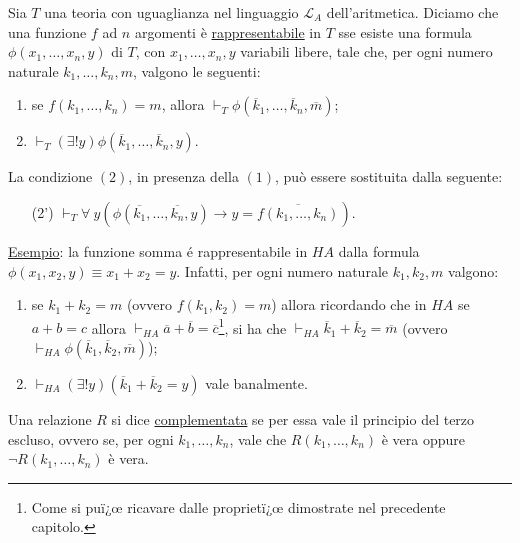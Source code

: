 \begin{defi}
Sia $T$ una teoria con uguaglianza nel linguaggio $\mathcal{L}_{A}$ dell'aritmetica. Diciamo che una funzione $f$ ad $n$ argomenti \`e \underline{rappresentabile} in $T$ sse esiste una formula $\phi(x_{1}, \ldots,x_{n}, y)$ di $T$, con $x_{1}, \ldots, x_{n}, y$ variabili libere, tale che, per ogni numero naturale $k_{1}, \ldots, k_{n}, m$, valgono le seguenti:
\begin{enumerate}
  \item se $f(k_{1}, \ldots,k_{n})=m$, allora $\vdash_{T} \phi(\overline{k}_{1}, \ldots, \overline{k}_{n}, \overline{m})$;
  \item $\vdash_{T} (\exists ! y) \phi(\overline{k}_{1}, \ldots, \overline{k}_{n}, y)$.
\end{enumerate}
La condizione $(2)$, in presenza della $(1)$, pu\`o essere sostituita dalla seguente:
\begin{enumerate}
\item[(2')] $\vdash_{T} \forall\ y (\phi(\overline{k_1},\ldots,\overline{k_n}, y)\rightarrow y = \overline{f(k_1,\ldots,k_n)})$.
\end{enumerate}
\end{defi}
\vspace{0.1cm}
\underline{Esempio}: la funzione somma \'e rappresentabile in $HA$ dalla formula $\phi(x_{1},x_{2},y)\equiv x_{1}+x_{2}=y$. Infatti, per ogni numero naturale $k_{1}, k_{2}, m$ valgono:\\
 \begin{enumerate}
  \item se $k_{1}+k_{2}=m$ (ovvero $f(k_{1}, k_{2})=m$) allora ricordando che in $HA$ se $a+b=c$ allora $\vdash_{HA} \overline{a}+\overline{b}=\overline{c}$\footnote{Come si puï¿œ ricavare dalle proprietï¿œ dimostrate nel precedente capitolo.}, si ha che $\vdash_{HA} \overline{k}_{1}+\overline{k}_{2}=\overline{m}$ (ovvero $\vdash_{HA} \phi(\overline{k}_{1}, \overline{k}_{2}, \overline{m})$);
  \item $\vdash_{HA}(\exists ! y) (\overline{k}_{1} + \overline{k}_{2}= y)$ vale banalmente.
\end{enumerate}
\vspace{0.5cm}
\begin{defi}
Una relazione $R$ si dice \underline{complementata} se per essa vale il principio del terzo escluso, ovvero se, per ogni $k_1,\ldots,k_n$, vale che $R(k_1,\ldots,k_n)$ \`e vera oppure $\neg R(k_1,\ldots,k_n)$ \`e vera.
\end{defi}
\vspace{0.7cm}

